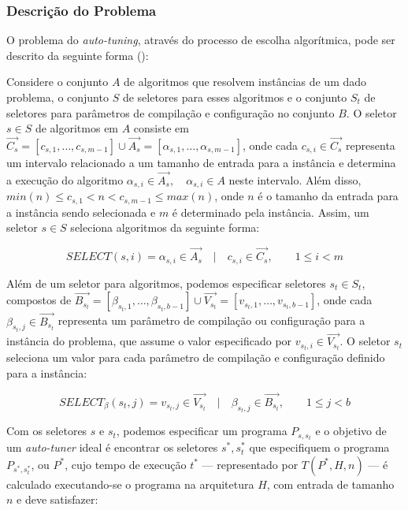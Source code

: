 \documentclass[a4paper, 12pt]{article}
\begin{document}
\subsubsection{Descrição do Problema}

O problema do \emph{auto-tuning}, através do processo de escolha algorítmica,
pode ser descrito da seguinte forma (\citet{ansel2011efficient}):

Considere o conjunto $A$ de algoritmos que resolvem instâncias de um dado
problema, o conjunto $S$ de seletores para esses algoritmos e o conjunto $S_t$
de seletores para parâmetros de compilação e configuração no conjunto $B$.
O seletor $s \in S$ de algoritmos em $A$ consiste em
$\overrightarrow{C_s} = [c_{s,1},\dots,c_{s,m-1}] \cup \overrightarrow{A_s} =
[\alpha_{s,1},\dots,\alpha_{s,m-1}]$,
onde cada $c_{s,i} \in \overrightarrow{C_s}$ representa um intervalo
relacionado a um tamanho de entrada para a instância e
determina a execução do algoritmo $\alpha_{s,i} \in \overrightarrow{A_s},
\quad \alpha_{s,i} \in A$ neste intervalo.
Além disso, $min(n) \leq c_{s,1} < n < c_{s,m-1} \leq max(n)$,
onde $n$ é o tamanho da entrada para a instância sendo selecionada e $m$
é determinado pela instância.
Assim, um seletor $s \in S$ seleciona algoritmos da seguinte forma:

\begin{equation*}
    SELECT(s, i) = \alpha_{s,i} \in \overrightarrow{A_{s}} \quad | \quad c_{s,i} \in \overrightarrow{C_{s}},
    \quad\quad 1 \leq i < m
\end{equation*}

Além de um seletor para algoritmos, podemos especificar seletores $s_t \in S_t$,
compostos de $\overrightarrow{B_{s_t}} = [\beta_{s_t,1},\dots,\beta_{s_t,b-1}]
\cup \overrightarrow{V_{s_t}} = [v_{s_t,1},\dots,v_{s_t,b-1}]$,
onde cada $\beta_{s_t,j} \in \overrightarrow{B_{s_t}}$ representa um parâmetro
de compilação ou configuração para a instância do problema, que assume o valor
especificado por $v_{s_t,i} \in \overrightarrow{V_{s_t}}$.
O seletor $s_t$ seleciona um valor para cada parâmetro de compilação e
configuração definido para a instância:

\begin{equation*}
    SELECT_{\beta}(s_t, j) = v_{s_t,j} \in \overrightarrow{V_{s_t}} \quad | \quad \beta_{s_t,j} \in \overrightarrow{B_{s_t}},
    \quad\quad 1 \leq j < b
\end{equation*}

Com os seletores $s$ e $s_t$, podemos especificar um programa
$P_{s,s_t}$ e o objetivo de um \emph{auto-tuner} ideal é encontrar
os seletores $s^*,s_{t}^{*}$ que especifiquem o programa $P_{s^*,s_{t}^{*}}$,
ou $P^*$, cujo tempo de execução $t^*$ --- representado por $T(P^*,H,n)$ ---
é calculado executando-se o programa na arquitetura $H$, com entrada de tamanho
$n$ e deve satisfazer:
\end{document}

